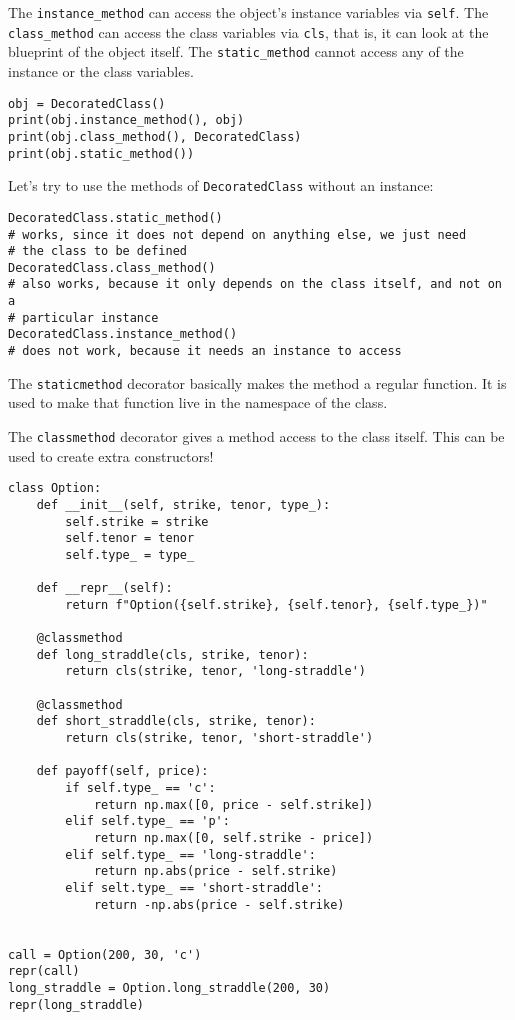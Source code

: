 \documentclass[12pt, a4paper]{article}
\begin{document}
The \texttt{instance\_method} can access the object's instance variables via \texttt{self}.
The \texttt{class\_method} can access the class variables via \texttt{cls}, that is, it can look at the blueprint of the object itself.
The \texttt{static\_method} cannot access any of the instance or the class variables.
\lstset{language=jupyter-python,label= ,caption= ,captionpos=b,numbers=none}
\begin{lstlisting}
obj = DecoratedClass()
print(obj.instance_method(), obj)
print(obj.class_method(), DecoratedClass)
print(obj.static_method())
\end{lstlisting}

Let's try to use the methods of \texttt{DecoratedClass} without an instance:
\lstset{language=jupyter-python,label= ,caption= ,captionpos=b,numbers=none}
\begin{lstlisting}
DecoratedClass.static_method()
# works, since it does not depend on anything else, we just need
# the class to be defined
DecoratedClass.class_method()
# also works, because it only depends on the class itself, and not on a
# particular instance
DecoratedClass.instance_method()
# does not work, because it needs an instance to access
\end{lstlisting}

The \texttt{staticmethod} decorator basically makes the method a regular function.
It is used to make that function live in the namespace of the class.

The \texttt{classmethod} decorator gives a method access to the class itself.
This can be used to create extra constructors!
\lstset{language=jupyter-python,label= ,caption= ,captionpos=b,numbers=none}
\begin{lstlisting}
class Option:
    def __init__(self, strike, tenor, type_):
        self.strike = strike
        self.tenor = tenor
        self.type_ = type_

    def __repr__(self):
        return f"Option({self.strike}, {self.tenor}, {self.type_})"

    @classmethod
    def long_straddle(cls, strike, tenor):
        return cls(strike, tenor, 'long-straddle')

    @classmethod
    def short_straddle(cls, strike, tenor):
        return cls(strike, tenor, 'short-straddle')

    def payoff(self, price):
        if self.type_ == 'c':
            return np.max([0, price - self.strike])
        elif self.type_ == 'p':
            return np.max([0, self.strike - price])
        elif self.type_ == 'long-straddle':
            return np.abs(price - self.strike)
        elif selt.type_ == 'short-straddle':
            return -np.abs(price - self.strike)


call = Option(200, 30, 'c')
repr(call)
long_straddle = Option.long_straddle(200, 30)
repr(long_straddle)
\end{lstlisting}
\end{document}
